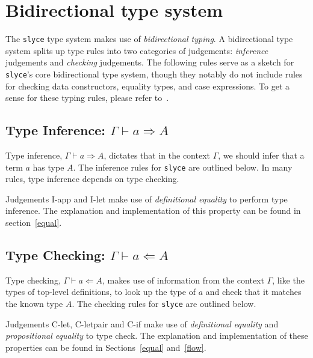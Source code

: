 \section{Bidirectional type system}
The \texttt{slyce} type system makes use of \emph{bidirectional typing}. 
A bidirectional type system splits up type rules into two categories of judgements: \emph{inference} judgements and \emph{checking} judgements.
The following rules serve as a sketch for \texttt{slyce}'s core bidirectional type system, though they notably do not include rules for checking data constructors, equality types, and case expressions.
To get a sense for these typing rules, please refer to~\cite{weirich2022implementing}.
\subsection{Type Inference: $\Gamma\vdash a \Rightarrow A$}
Type inference, $\Gamma\vdash a \Rightarrow A$\footnotemark, dictates that in the context $\Gamma$, we should infer that a term $a$ has type $A$.
The inference rules for \texttt{slyce} are outlined below.
In many rules, type inference depends on type checking.



Judgements I-app and I-let make use of \emph{definitional equality} to perform type inference. 
The explanation and implementation of this property can be found in section~\ref{equal}.

\subsection{Type Checking: $\Gamma\vdash a \Leftarrow A$}
Type checking, $\Gamma\vdash a \Leftarrow A$, makes use of information from the context $\Gamma$, like the types of top-level definitions, to look up the type of $a$ and check that it matches the known type $A$.
The checking rules for \texttt{slyce} are outlined below.


Judgements C-let, C-letpair and C-if make use of \emph{definitional equality} and \emph{propositional equality} to type check. 
The explanation and implementation of these properties can be found in Sections~\ref{equal} and~\ref{flow}.


